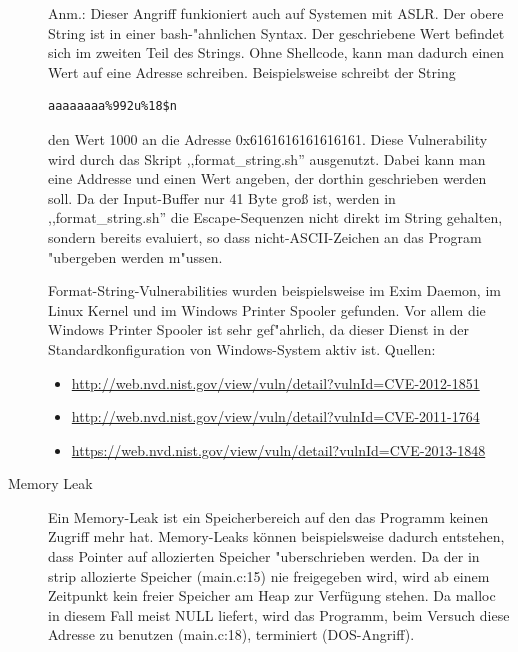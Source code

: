 \documentclass[12pt,a4paper,titlepage,oneside]{scrartcl}
\begin{document}
\begin{description}
\begin{itemize}
\begin{lstlisting}
        \end{lstlisting}
    \end{itemize}
    Anm.: Dieser Angriff funkioniert auch auf Systemen mit ASLR. Der obere String ist in einer bash-"ahnlichen Syntax.\newline
    Der geschriebene Wert befindet sich im zweiten Teil des Strings. Ohne Shellcode, kann man dadurch einen Wert auf eine Adresse schreiben.\newline
    Beispielsweise schreibt der String
    \begin{lstlisting}
aaaaaaaa%992u%18$n
	 \end{lstlisting}
	 den Wert 1000 an die Adresse 0x6161616161616161.\newline
    Diese Vulnerability wird durch das Skript ,,format\_string.sh'' ausgenutzt. Dabei kann man eine Addresse und einen Wert angeben, der dorthin geschrieben werden soll.\newline
    Da der Input-Buffer nur 41 Byte groß ist, werden in ,,format_string.sh'' die Escape-Sequenzen nicht direkt im String gehalten, sondern bereits evaluiert, so dass nicht-ASCII-Zeichen an das Program "ubergeben werden m"ussen.
    
    Format-String-Vulnerabilities wurden beispielsweise im Exim Daemon, im Linux Kernel und im Windows Printer Spooler gefunden. Vor allem die Windows Printer Spooler ist sehr gef"ahrlich, da dieser Dienst in der Standardkonfiguration von Windows-System aktiv ist.
    Quellen:
    \begin{itemize}
    \item \url{http://web.nvd.nist.gov/view/vuln/detail?vulnId=CVE-2012-1851}
    \item \url{http://web.nvd.nist.gov/view/vuln/detail?vulnId=CVE-2011-1764}
    \item \url{https://web.nvd.nist.gov/view/vuln/detail?vulnId=CVE-2013-1848}
\end{itemize}
    \item[Memory Leak]
    Ein Memory-Leak ist ein Speicherbereich auf den das Programm keinen Zugriff mehr hat. Memory-Leaks können beispielsweise dadurch entstehen, dass Pointer auf allozierten Speicher "uberschrieben werden.
    Da der in strip allozierte Speicher (main.c:15) nie freigegeben wird, wird ab einem Zeitpunkt kein freier Speicher am Heap zur Verfügung stehen. Da malloc in diesem Fall meist NULL liefert, wird das Programm, beim Versuch diese Adresse zu benutzen (main.c:18), terminiert (DOS-Angriff).\newline
    

\end{description}
\end{document}
